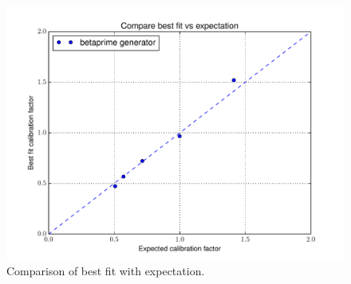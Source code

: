  \begin{figure}[htbp] \begin{center} 
\includegraphics[width=1.00\textwidth]{../FIGURES/155/FIG_Compare_best_fit_vs_expectation.pdf} 
\caption{Comparison of best fit with expectation.} 
\label{tab:extra_155} 
\end{center} \end{figure} 
\clearpage
 